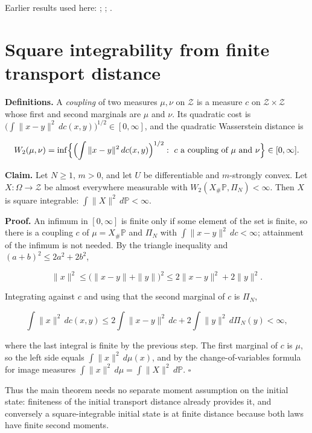 \documentclass[11pt,a4paper]{article}
\begin{document}
Earlier results used here: \cite[Section~3.26.13]{LangevinLean2026ULASC}; \cite[Section~3.26.15]{LangevinLean2026ULASC}; \cite[Section~3.26.3]{LangevinLean2026ULASC}.

\section{\texorpdfstring{Square integrability from finite transport distance}{Square integrability from finite transport distance}}


\textbf{Definitions.} A \emph{coupling} of two measures \(\mu,\nu\) on \(\mathcal Z\) is a measure \(c\) on \(\mathcal Z\times\mathcal Z\) whose first and second marginals are \(\mu\) and \(\nu\). Its quadratic cost is \(\bigl(\int\|x-y\|^2\,dc(x,y)\bigr)^{1/2}\in[0,\infty]\), and the quadratic Wasserstein distance is


\[W_2(\mu,\nu)=\inf\Bigl\{\Bigl(\int\|x-y\|^2\,dc(x,y)\Bigr)^{1/2}:\ c\text{ a coupling of }\mu\text{ and }\nu\Bigr\}\in[0,\infty].\]


\textbf{Claim.} Let \(N\ge1\), \(m>0\), and let \(U\) be differentiable and \(m\)-strongly convex. Let \(X:\Omega\to\mathcal Z\) be almost everywhere measurable with \(W_2(X_\#\mathbb P,\Pi_N)<\infty\). Then \(X\) is square integrable: \(\int\|X\|^2\,d\mathbb P<\infty\).




\textbf{Proof.} An infimum in \([0,\infty]\) is finite only if some element of the set is finite, so there is a coupling \(c\) of \(\mu=X_\#\mathbb P\) and \(\Pi_N\) with \(\int\|x-y\|^2\,dc<\infty\); attainment of the infimum is not needed. By the triangle inequality and \((a+b)^2\le2a^2+2b^2\),


\[\|x\|^2\le\bigl(\|x-y\|+\|y\|\bigr)^2\le2\|x-y\|^2+2\|y\|^2 .\]


Integrating against \(c\) and using that the second marginal of \(c\) is \(\Pi_N\),


\[\int\|x\|^2\,dc(x,y)\le2\int\|x-y\|^2\,dc+2\int\|y\|^2\,d\Pi_N(y)<\infty,\]


where the last integral is finite by the previous step. The first marginal of \(c\) is \(\mu\), so the left side equals \(\int\|x\|^2\,d\mu(x)\), and by the change-of-variables formula for image measures \(\int\|x\|^2\,d\mu=\int\|X\|^2\,d\mathbb P\). \(\square\)




Thus the main theorem needs no separate moment assumption on the initial state: finiteness of the initial transport distance already provides it, and conversely a square-integrable initial state is at finite distance because both laws have finite second moments.
\end{document}
